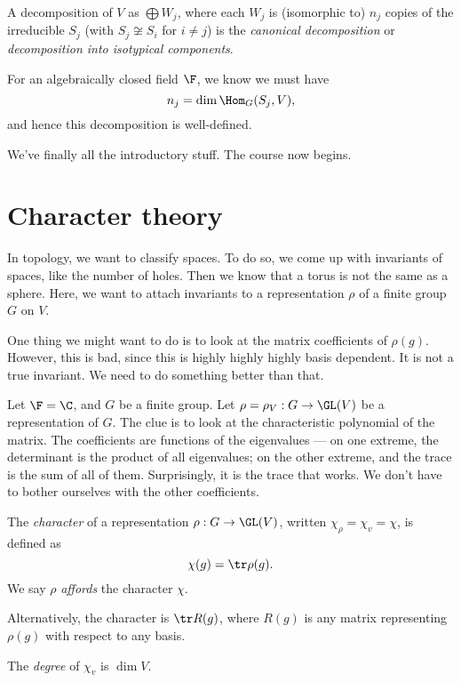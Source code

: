 \documentclass[a4paper]{article}
\begin{document}
\begin{defi}
  A decomposition of $V$ as $\bigoplus W_j$, where each $W_j$ is (isomorphic to) $n_j$ copies of the irreducible $S_j$ (with $S_j \not \cong S_i$ for $i \not= j$) is the \emph{canonical decomposition} or \emph{decomposition into isotypical components}.
\end{defi}
For an algebraically closed field $\F$, we know we must have
\[
  n_j = \dim \Hom_G(S_j, V),
\]
and hence this decomposition is well-defined.

We've finally all the introductory stuff. The course now begins.

\section{Character theory}
In topology, we want to classify spaces. To do so, we come up with invariants of spaces, like the number of holes. Then we know that a torus is not the same as a sphere. Here, we want to attach invariants to a representation $\rho$ of a finite group $G$ on $V$.

One thing we might want to do is to look at the matrix coefficients of $\rho(g)$. However, this is bad, since this is highly highly highly basis dependent. It is not a true invariant. We need to do something better than that.

Let $\F = \C$, and $G$ be a finite group. Let $\rho = \rho_V: G \to \GL(V)$ be a representation of $G$. The clue is to look at the characteristic polynomial of the matrix. The coefficients are functions of the eigenvalues --- on one extreme, the determinant is the product of all eigenvalues; on the other extreme, and the trace is the sum of all of them. Surprisingly, it is the trace that works. We don't have to bother ourselves with the other coefficients.

\begin{defi}[Character]
  The \emph{character} of a representation $\rho: G \to \GL(V)$, written $\chi_\rho = \chi_v = \chi$, is defined as
  \[
    \chi(g) = \tr \rho(g).
  \]
  We say $\rho$ \emph{affords} the character $\chi$.

  Alternatively, the character is $\tr R(g)$, where $R(g)$ is any matrix representing $\rho(g)$ with respect to any basis.
\end{defi}

\begin{defi}
  The \emph{degree} of $\chi_v$ is $\dim V$.
\end{defi}
\end{document}

